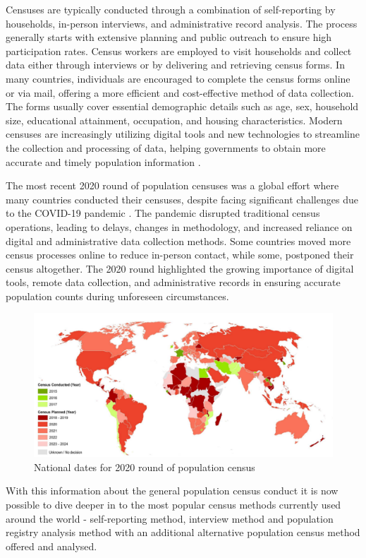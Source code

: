 Censuses are typically conducted through a combination of self-reporting by households, in-person interviews, and administrative record analysis. The process generally starts with extensive planning and public outreach to ensure high participation rates. Census workers are employed to visit households and collect data either through interviews or by delivering and retrieving census forms. In many countries, individuals are encouraged to complete the census forms online or via mail, offering a more efficient and cost-effective method of data collection. The forms usually cover essential demographic details such as age, sex, household size, educational attainment, occupation, and housing characteristics. Modern censuses are increasingly utilizing digital tools and new technologies to streamline the collection and processing of data, helping governments to obtain more accurate and timely population information \cite{CensusPrinciplesAndRecommendations}.

The most recent 2020 round of population censuses was a global effort where many countries conducted their censuses, despite facing significant challenges due to the COVID-19 pandemic \cite{Codid19ImplicationsOnCensusConduct}. The pandemic disrupted traditional census operations, leading to delays, changes in methodology, and increased reliance on digital and administrative data collection methods. Some countries moved more census processes online to reduce in-person contact, while some, postponed their census altogether. The 2020 round highlighted the growing importance of digital tools, remote data collection, and administrative records in ensuring accurate population counts during unforeseen circumstances.

\begin{figure}[H]
    \centering
    \includegraphics[scale=0.5]{images/most-recent-census-conducting-year-world-map.png}
    \caption{National dates for 2020 round of population census \cite{WorldMapOf2020RoundCensus}}
    \label{img:most-recent-census-conducting-year-world-map}
\end{figure}

With this information about the general population census conduct it is now possible to dive deeper in to the most popular census methods currently used around the world - self-reporting method, interview method and population registry analysis method with an additional alternative population census method offered and analysed.
